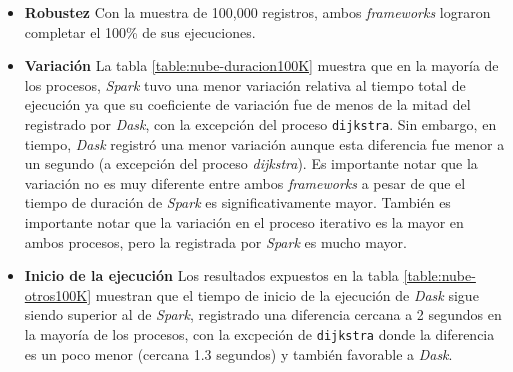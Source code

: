 \begin{itemize}
	
	\item \textbf{Robustez} Con la muestra de 100,000 registros, ambos \textit{frameworks} lograron completar el 100\% de sus ejecuciones.
	
	\item \textbf{Variación} La tabla \ref{table:nube-duracion100K} muestra que en la mayoría de los procesos, \textit{Spark} tuvo una menor variación relativa al tiempo total de ejecución ya que su coeficiente de variación fue de menos de la mitad del registrado por \textit{Dask}, con la excepción del proceso \texttt{dijkstra}. Sin embargo, en tiempo, \textit{Dask} registró una menor variación aunque esta diferencia fue menor a un segundo (a excepción del proceso \textit{dijkstra}). Es importante notar que la variación no es muy diferente entre ambos \textit{frameworks} a pesar de que el tiempo de duración de \textit{Spark} es significativamente mayor. También es importante notar que la variación en el proceso iterativo es la mayor en ambos procesos, pero la registrada por \textit{Spark} es mucho mayor.
	
	\item \textbf{Inicio de la ejecución} Los resultados expuestos en la tabla \ref{table:nube-otros100K} muestran que el tiempo de inicio de la ejecución de \textit{Dask} sigue siendo superior al de \textit{Spark}, registrado una diferencia cercana a 2 segundos en la mayoría de los procesos, con la excpeción de \texttt{dijkstra} donde la diferencia es un poco menor (cercana 1.3 segundos) y también favorable a \textit{Dask}. 
	

\end{itemize}
